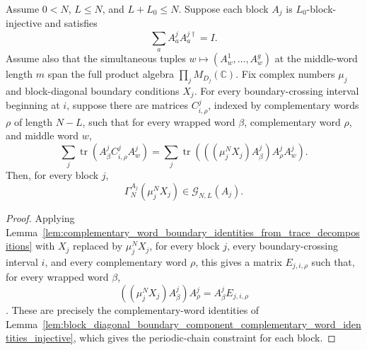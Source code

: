 \begin{lemma}
    \label{lem:block_diagonal_boundary_component_trace_decomposition_injective}
    \leanok
    Assume \(0<N\), \(L\le N\), and \(L+L_0\le N\). Suppose each block \(A_j\)
    is \(L_0\)-block-injective and satisfies
    \[
        \sum_a A^j_aA^{j\dagger}_a=I .
    \]
    Assume also that the simultaneous tuples \(w\mapsto(A^1_w,\ldots,A^g_w)\)
    at the middle-word length \(m\) span the full product algebra
    \(\prod_jM_{D_j}(\mathbb C)\).
    Fix complex numbers \(\mu_j\) and block-diagonal boundary conditions
    \(X_j\). For every boundary-crossing interval beginning at \(i\), suppose
    there are matrices \(C^j_{i,\rho}\), indexed by complementary words
    \(\rho\) of length \(N-L\), such that for every wrapped word \(\beta\),
    complementary word \(\rho\), and middle word \(w\),
    \[
        \sum_j\operatorname{tr}\!\left(A^j_\beta C^j_{i,\rho}A^j_w\right)
        =
        \sum_j
        \operatorname{tr}\!\left(((\mu_j^NX_j)A^j_\beta)A^j_\rho A^j_w\right).
    \]
    Then, for every block \(j\),
    \[
        \Gamma_N^{A_j}(\mu_j^NX_j)\in\mathcal G_{N,L}(A_j).
    \]
\end{lemma}

\begin{proof}
    \leanok
    Applying
    Lemma~\ref{lem:complementary_word_boundary_identities_from_trace_decompositions}
    with \(X_j\) replaced by \(\mu_j^NX_j\), for every block \(j\), every
    boundary-crossing interval \(i\), and every complementary word \(\rho\),
    this gives a matrix \(E_{j,i,\rho}\) such that, for every wrapped word
    \(\beta\),
    \[
        ((\mu_j^NX_j)A^j_\beta)A^j_\rho=A^j_\beta E_{j,i,\rho}
    \].
    These are precisely the complementary-word
    identities of
    Lemma~\ref{lem:block_diagonal_boundary_component_complementary_word_identities_injective},
    which gives the periodic-chain constraint for each block.
\end{proof}

